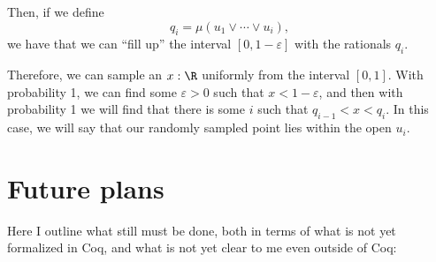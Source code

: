 Then, if we define
\[
q_i = \mu(u_1 \vee \cdots \vee u_i),
\]
we have that we can ``fill up'' the interval $[0, 1 - \varepsilon]$ with the rationals $q_i$.

Therefore, we can sample an $x : \R$ uniformly from the interval $[0, 1]$. With probability 1, we can find some $\varepsilon > 0$ such that $x < 1 - \varepsilon$, and then with probability 1 we will find that there is some $i$ such that $q_{i-1} < x < q_i$. In this case, we will say that our randomly sampled point lies within the open $u_i$.

\section{Future plans}

Here I outline what still must be done, both in terms of what is not yet formalized in Coq, and what is not yet clear to me even outside of Coq:

